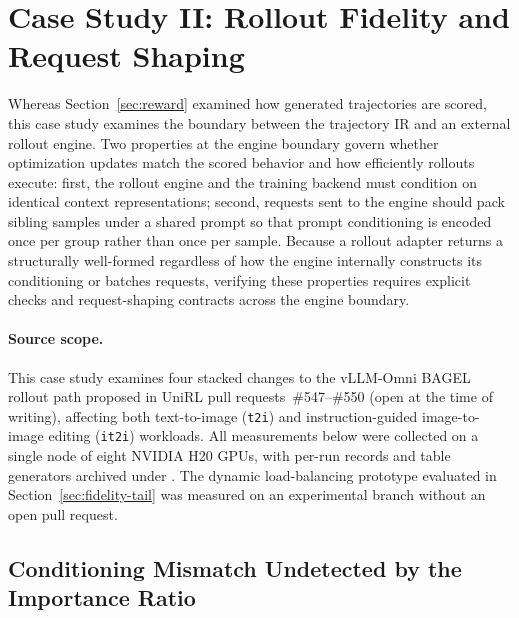 

\section{Case Study II: Rollout Fidelity and Request Shaping}
\label{sec:fidelity}

Whereas Section~\ref{sec:reward} examined how generated trajectories are scored, this case study examines the boundary between the trajectory IR and an external rollout engine.
Two properties at the engine boundary govern whether optimization updates match the scored behavior and how efficiently rollouts execute: first, the rollout engine and the training backend must condition on identical context representations; second, requests sent to the engine should pack sibling samples under a shared prompt so that prompt conditioning is encoded once per group rather than once per sample.
Because a rollout adapter returns a structurally well-formed \sample{} regardless of how the engine internally constructs its conditioning or batches requests, verifying these properties requires explicit checks and request-shaping contracts across the engine boundary.

\paragraph{Source scope.}
This case study examines four stacked changes to the vLLM-Omni BAGEL rollout path proposed in UniRL pull requests~\#547--\#550 (open at the time of writing), affecting both text-to-image (\texttt{t2i}) and instruction-guided image-to-image editing (\texttt{it2i}) workloads.
All measurements below were collected on a single node of eight NVIDIA H20 GPUs, with per-run records and table generators archived under .
The dynamic load-balancing prototype evaluated in Section~\ref{sec:fidelity-tail} was measured on an experimental branch without an open pull request.

\subsection{Conditioning Mismatch Undetected by the Importance Ratio}
\label{sec:fidelity-layout}

